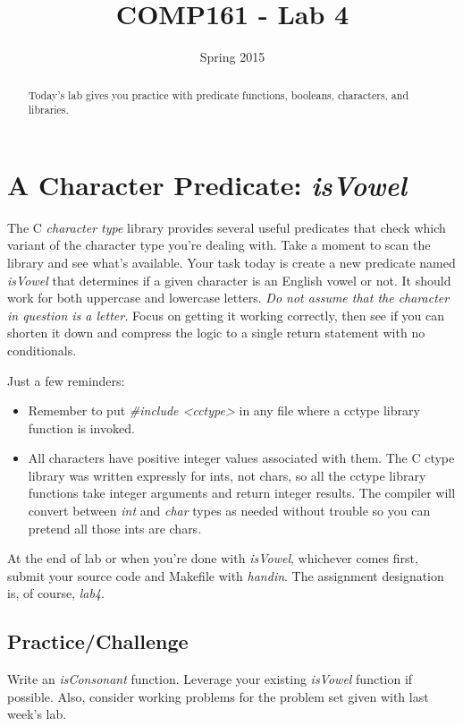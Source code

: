 \documentclass[]{tufte-handout}
\title{COMP161 - Lab 4}
\author{}
\date{Spring 2015}
\begin{document}
\maketitle

\begin{abstract}
Today's lab gives you practice with predicate functions, booleans, characters, and libraries.
\end{abstract}

\section{A Character Predicate: \textit{isVowel}}

The C \textit{character type} library provides several useful predicates that check which variant of the character type you're dealing with. Take a moment to scan the library and see what's available. Your task today is create a new predicate named \textit{isVowel} that determines if a given character is an English vowel or not. It should work for both uppercase and lowercase letters. \textit{Do not assume that the character in question is a letter.} Focus on getting it working correctly, then see if you can shorten it down and compress the logic to a single return statement with no conditionals.

Just a few reminders:
\begin{itemize}
\item Remember to put \textit{\#include <cctype>} in any file where a cctype library function is invoked.

\item All characters have positive integer values associated with them. The C ctype library was written expressly for ints, not chars, so all the cctype library functions take integer arguments and return integer results. The compiler will convert between \textit{int} and \textit{char} types as needed without trouble so you can pretend all those ints are chars.
\end{itemize}

At the end of lab or when you're done with \textit{isVowel}, whichever comes first, submit your source code and Makefile with \textit{handin}. The assignment designation is, of course, \textit{lab4}.

\subsection{Practice/Challenge}

Write an \textit{isConsonant} function. Leverage your existing \textit{isVowel} function if possible. Also, consider working problems for the problem set given with last week's lab.
\end{document}
